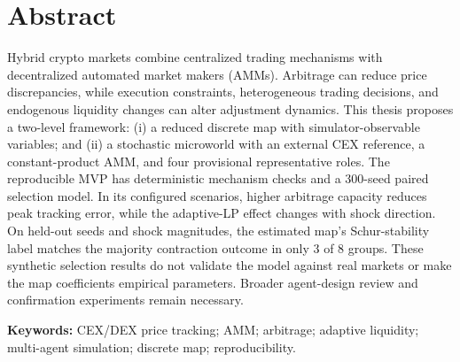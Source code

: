 \section{Abstract}

Hybrid crypto markets combine centralized trading mechanisms with decentralized
automated market makers (AMMs). Arbitrage can reduce price discrepancies, while
execution constraints, heterogeneous trading decisions, and endogenous liquidity
changes can alter adjustment dynamics. This thesis proposes a two-level framework:
(i) a reduced discrete map with simulator-observable variables; and (ii) a stochastic
microworld with an external CEX reference, a constant-product AMM, and four provisional
representative roles. The reproducible MVP has deterministic mechanism checks and a
300-seed paired selection model. In its configured scenarios, higher arbitrage capacity
reduces peak tracking error, while the adaptive-LP effect changes with shock direction.
On held-out seeds and shock magnitudes, the estimated map's Schur-stability label
matches the majority contraction outcome in only 3 of 8 groups. These synthetic
selection results do not validate the model against real markets or make the map
coefficients empirical parameters. Broader agent-design review and confirmation
experiments remain necessary.

\textbf{Keywords:} CEX/DEX price tracking; AMM; arbitrage; adaptive liquidity;
multi-agent simulation; discrete map; reproducibility.
